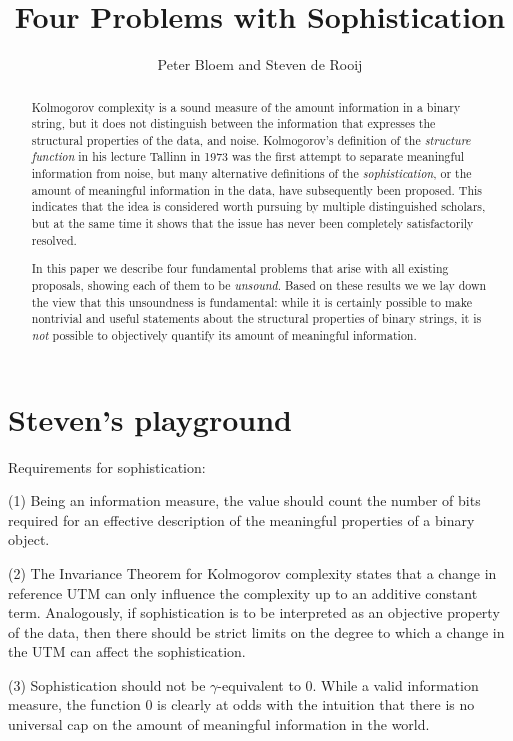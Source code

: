 \documentclass{style/llncs}
\title{Four Problems with Sophistication}
\author{Peter Bloem and Steven de Rooij}
\institute{
  System and Network Engineering Group, \\University of Amsterdam, the Netherlands\\
  \email{uva@peterbloem.nl, steven.de.rooij@gmail.com}
}
\begin{document}
\maketitle

\begin{abstract}
Kolmogorov complexity is a sound measure of the amount information in a binary string, but it does not distinguish between the information that expresses the structural properties of the data, and noise. Kolmogorov's definition of the \emph{structure function} in his lecture Tallinn in 1973 was the first attempt to separate meaningful information from noise, but many alternative definitions of the \emph{sophistication}, or the amount of meaningful information in the data, have subsequently been proposed. This indicates that the idea is considered worth pursuing by multiple distinguished scholars, but at the same time it shows that the issue has never been completely satisfactorily resolved.

In this paper we describe four fundamental problems that arise with all existing proposals, showing each of them to be \emph{unsound}. Based on these results we we lay down the view that this unsoundness is fundamental: while it is certainly possible to make nontrivial and useful statements about the structural properties of binary strings, it is \emph{not} possible to objectively quantify its amount of meaningful information.
\end{abstract}

\section*{Steven's playground}

Requirements for sophistication:

(1) Being an information measure, the value should count the number of bits required for an effective description of the meaningful properties of a binary object.

(2) The Invariance Theorem for Kolmogorov complexity states that a change in reference UTM can only influence the complexity up to an additive constant term. Analogously, if sophistication is to be interpreted as an objective property of the data, then there should be strict limits on the degree to which a change in the UTM can affect the sophistication.

(3) Sophistication should not be $\gamma$-equivalent to 0. While a valid information measure, the function 0 is clearly at odds with the intuition that there is no universal cap on the amount of meaningful information in the world.
\end{document}
